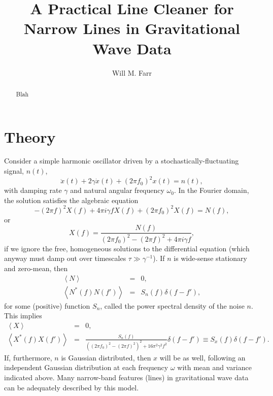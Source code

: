 \documentclass[modern]{aastex631}
\begin{document}
\title{A Practical Line Cleaner for Narrow Lines in Gravitational Wave Data}

\author[0000-0003-1540-8562]{Will M. Farr}

\begin{abstract}
    Blah
\end{abstract}

\section{Theory}

Consider a simple harmonic oscillator driven by a stochastically-fluctuating
signal, $n(t)$,
\begin{equation}
    \ddot{x}(t) + 2\gamma\dot{x}(t) + \left( 2 \pi f_0 \right)^2 x(t) = n(t),
\end{equation}
with damping rate $\gamma$ and natural angular frequency $\omega_0$.  In the
Fourier domain, the solution satisfies the algebraic equation 
\begin{equation}
    -\left( 2 \pi f \right)^2 X(f) + 4 \pi i\gamma f X(f) + \left( 2 \pi f_0 \right)^2 X(f) = N(f),
\end{equation}
or
\begin{equation}
    X(f) = \frac{N(f)}{\left( 2 \pi f_0 \right)^2 - \left( 2 \pi f \right)^2 + 4 \pi i\gamma f},
\end{equation}
if we ignore the free, homogeneous solutions to the differential equation (which
anyway must damp out over timescales $\tau \gg \gamma^{-1}$).  If $n$ is
wide-sense stationary and zero-mean, then 
\begin{eqnarray}
    \left\langle N \right\rangle & = & 0, \\
    \left\langle N^*(f)N(f') \right\rangle & = &
    S_n(f) \delta(f - f'),
\end{eqnarray}
for some (positive) function $S_n$, called the power spectral density of the
noise $n$.  This implies 
\begin{eqnarray}
    \left\langle X \right\rangle & = & 0, \\
    \left\langle X^*(f)X(f') \right\rangle & = & \frac{S_n(f)}{\left(\left( 2 \pi f_0 \right)^2 - \left( 2 \pi f \right)^2\right)^2 + 16 \pi^2 \gamma^2 f^2}\delta(f - f') \equiv S_x(f) \delta\left( f - f' \right).
\end{eqnarray}
If, furthermore, $n$ is Gaussian distributed, then $x$ will be as well,
following an independent Gaussian distribution at each frequency $\omega$ with
mean and variance indicated above.  Many narrow-band features (lines) in
gravitational wave data can be adequately described by this model.  
\end{document}
